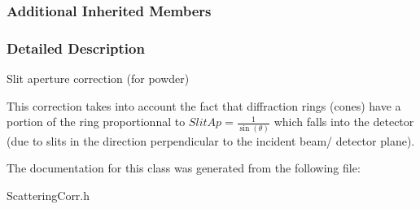 \subsubsection*{Additional Inherited Members}


\subsubsection{Detailed Description}
Slit aperture correction (for powder) 

This correction takes into account the fact that diffraction rings (cones) have a portion of the ring proportionnal to $ SlitAp = \frac{1}{\sin(\theta)} $ which falls into the detector (due to slits in the direction perpendicular to the incident beam/ detector plane). 

The documentation for this class was generated from the following file\-:\begin{DoxyCompactItemize}
\item 
Scattering\-Corr.\-h\end{DoxyCompactItemize}
